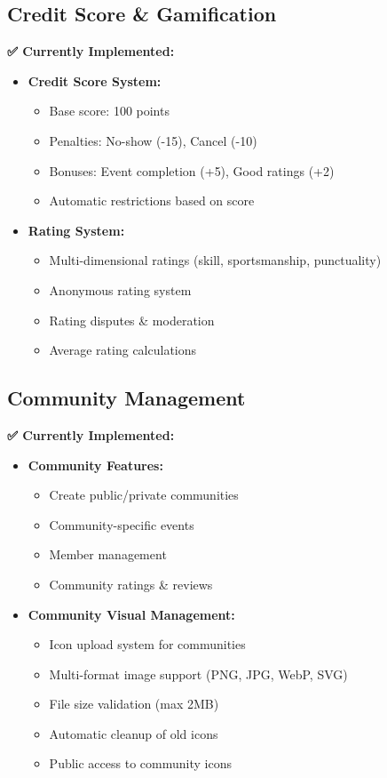 \documentclass[12pt,a4paper]{article}
\begin{document}
\subsection{Credit Score \& Gamification}

\begin{implemented}
\textbf{✅ Currently Implemented:}
\begin{itemize}
    \item \textbf{Credit Score System:}
    \begin{itemize}
        \item Base score: 100 points
        \item Penalties: No-show (-15), Cancel (-10)
        \item Bonuses: Event completion (+5), Good ratings (+2)
        \item Automatic restrictions based on score
    \end{itemize}
    \item \textbf{Rating System:}
    \begin{itemize}
        \item Multi-dimensional ratings (skill, sportsmanship, punctuality)
        \item Anonymous rating system
        \item Rating disputes \& moderation
        \item Average rating calculations
    \end{itemize}
\end{itemize}
\end{implemented}

\subsection{Community Management}

\begin{implemented}
\textbf{✅ Currently Implemented:}
\begin{itemize}
    \item \textbf{Community Features:}
    \begin{itemize}
        \item Create public/private communities
        \item Community-specific events
        \item Member management
        \item Community ratings \& reviews
    \end{itemize}
    \item \textbf{Community Visual Management:}
    \begin{itemize}
        \item Icon upload system for communities
        \item Multi-format image support (PNG, JPG, WebP, SVG)
        \item File size validation (max 2MB)
        \item Automatic cleanup of old icons
        \item Public access to community icons
    \end{itemize}
\end{itemize}
\end{implemented}
\end{document}
